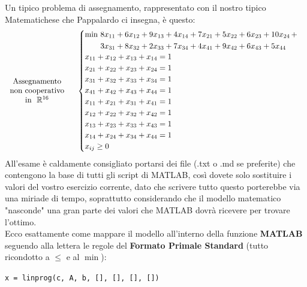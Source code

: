\documentclass[12pt, a4paper]{article}
\begin{document}
	Un tipico problema di assegnamento, rappresentato con il nostro tipico Matematichese che Pappalardo ci insegna, è questo:
	\[
	\begin{tabular}{c}
		\text{Assegnamento} \\
		\text{non cooperativo} \\
		\text{in } $\mathbb{R}^{16}$
	\end{tabular}
	\quad
	\begin{cases}
		\begin{aligned} 
			\min \ & 8x_{11} + 6x_{12} + 9x_{13} + 4x_{14} + 7x_{21} + 5x_{22} + 6x_{23} + 10x_{24} \, + \\
			& 3x_{31} + 8x_{32} + 2x_{33} + 7x_{34} + 4x_{41} + 9x_{42} + 6x_{43} + 5x_{44}
		\end{aligned}\\
		x_{11} + x_{12} + x_{13} + x_{14} = 1\\
		x_{21} + x_{22} + x_{23} + x_{24} = 1\\
		x_{31} + x_{32} + x_{33} + x_{34} = 1\\
		x_{41} + x_{42} + x_{43} + x_{44} = 1\\
		x_{11} + x_{21} + x_{31} + x_{41} = 1\\
		x_{12} + x_{22} + x_{32} + x_{42} = 1\\
		x_{13} + x_{23} + x_{33} + x_{43} = 1\\
		x_{14} + x_{24} + x_{34} + x_{44} = 1\\
		x_{ij} \geq 0
	\end{cases}
	\]
	All'esame è caldamente consigliato portarsi dei file (.txt o .md se preferite) che contengono la base di tutti gli script di MATLAB, così dovete solo sostituire i valori del vostro esercizio corrente, dato che scrivere tutto questo porterebbe via una miriade di tempo, soprattutto considerando che il modello matematico "nasconde" una gran parte dei valori che MATLAB dovrà ricevere per trovare l'ottimo.\\
	
	Ecco esattamente come mappare il modello all'interno della funzione \textbf{MATLAB} seguendo alla lettera le regole del \textbf{Formato Primale Standard} (tutto ricondotto a $\leq$ e al $\min$):
	\begin{center}
		\texttt{x = linprog(c, A, b, [], [], [], [])}
	\end{center}
	
\end{document}
